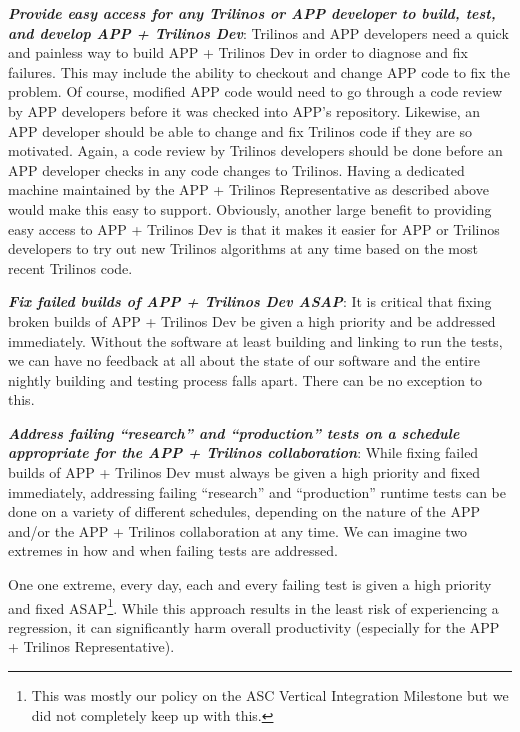 \documentclass[pdf,ps2pdf,11pt]{SANDreport}
\begin{document}
{}\textit{\textbf{Provide easy access for any Trilinos or APP developer to
build, test, and develop APP + Trilinos Dev}}: Trilinos and APP developers
need a quick and painless way to build APP + Trilinos Dev in order to diagnose
and fix failures.  This may include the ability to checkout and change APP
code to fix the problem.  Of course, modified APP code would need to go
through a code review by APP developers before it was checked into APP's
repository.  Likewise, an APP developer should be able to change and fix
Trilinos code if they are so motivated.  Again, a code review by Trilinos
developers should be done before an APP developer checks in any code changes
to Trilinos.  Having a dedicated machine maintained by the APP + Trilinos
Representative as described above would make this easy to support.  Obviously,
another large benefit to providing easy access to APP + Trilinos Dev is that
it makes it easier for APP or Trilinos developers to try out new Trilinos
algorithms at any time based on the most recent Trilinos code.

{}\textit{\textbf{Fix failed builds of APP + Trilinos Dev ASAP}}: It is
critical that fixing broken builds of APP + Trilinos Dev be given a high
priority and be addressed immediately.  Without the software at least building
and linking to run the tests, we can have no feedback at all about the state
of our software and the entire nightly building and testing process falls
apart.  There can be no exception to this.

{}\textit{\textbf{Address failing ``research'' and ``production'' tests on a
schedule appropriate for the APP + Trilinos collaboration}}: While fixing
failed builds of APP + Trilinos Dev must always be given a high priority and
fixed immediately, addressing failing ``research'' and ``production'' runtime
tests can be done on a variety of different schedules, depending on the nature
of the APP and/or the APP + Trilinos collaboration at any time.  We can
imagine two extremes in how and when failing tests are addressed.

One one extreme, every day, each and every failing test is given a high
priority and fixed ASAP\footnote{This was mostly our policy on the ASC
Vertical Integration Milestone but we did not completely keep up with this.}.
While this approach results in the least risk of experiencing a regression, it
can significantly harm overall productivity (especially for the APP + Trilinos
Representative).
\end{document}
